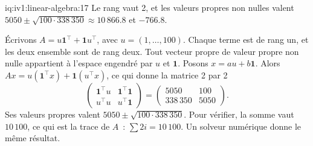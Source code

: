 \begin{solution}{iq:iv1:linear-algebra:17}
Le rang vaut 2, et les valeurs propres non nulles valent $5050 \pm \sqrt{100 \cdot 338\,350} \approx 10\,866.8$ et $-766.8$.

Écrivons $A = u\mathbf{1}^\top + \mathbf{1}u^\top$, avec $u = (1, \dots, 100)$. Chaque terme est de rang un, et les deux ensemble sont de rang deux. Tout vecteur propre de valeur propre non nulle appartient à l'espace engendré par $u$ et $\mathbf{1}$. Posons $x = au + b\mathbf{1}$. Alors $Ax = u(\mathbf{1}^\top x) + \mathbf{1}(u^\top x)$, ce qui donne la matrice 2 par 2
\[
\begin{pmatrix} \mathbf{1}^\top u & \mathbf{1}^\top\mathbf{1} \\ u^\top u & u^\top\mathbf{1} \end{pmatrix} = \begin{pmatrix} 5050 & 100 \\ 338\,350 & 5050 \end{pmatrix}.
\]
Ses valeurs propres valent $5050 \pm \sqrt{100 \cdot 338\,350}$. Pour vérifier, la somme vaut $10\,100$, ce qui est la trace de $A$~: $\sum 2i = 10\,100$. Un solveur numérique donne le même résultat.

\end{solution}

